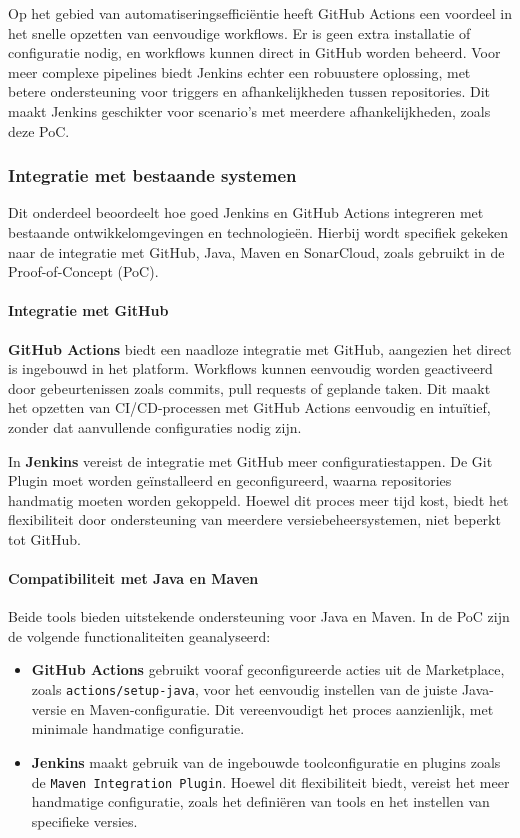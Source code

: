 Op het gebied van automatiseringsefficiëntie heeft GitHub Actions een voordeel in het snelle opzetten van eenvoudige workflows. Er is geen extra installatie of configuratie nodig, en workflows kunnen direct in GitHub worden beheerd. Voor meer complexe pipelines biedt Jenkins echter een robuustere oplossing, met betere ondersteuning voor triggers en afhankelijkheden tussen repositories. Dit maakt Jenkins geschikter voor scenario's met meerdere afhankelijkheden, zoals deze PoC.

\subsubsection{Integratie met bestaande systemen}
Dit onderdeel beoordeelt hoe goed Jenkins en GitHub Actions integreren met bestaande ontwikkelomgevingen en technologieën. Hierbij wordt specifiek gekeken naar de integratie met GitHub, Java, Maven en SonarCloud, zoals gebruikt in de Proof-of-Concept (PoC).

\paragraph{Integratie met GitHub}
\textbf{GitHub Actions} biedt een naadloze integratie met GitHub, aangezien het direct is ingebouwd in het platform. Workflows kunnen eenvoudig worden geactiveerd door gebeurtenissen zoals commits, pull requests of geplande taken. Dit maakt het opzetten van CI/CD-processen met GitHub Actions eenvoudig en intuïtief, zonder dat aanvullende configuraties nodig zijn.

In \textbf{Jenkins} vereist de integratie met GitHub meer configuratiestappen. De Git Plugin moet worden geïnstalleerd en geconfigureerd, waarna repositories handmatig moeten worden gekoppeld. Hoewel dit proces meer tijd kost, biedt het flexibiliteit door ondersteuning van meerdere versiebeheersystemen, niet beperkt tot GitHub.

\paragraph{Compatibiliteit met Java en Maven}
Beide tools bieden uitstekende ondersteuning voor Java en Maven. 
In de PoC zijn de volgende functionaliteiten geanalyseerd:
\begin{itemize}
    \item \textbf{GitHub Actions} gebruikt vooraf geconfigureerde acties uit de Marketplace, zoals \texttt{actions/setup-java}, voor het eenvoudig instellen van de juiste Java-versie en Maven-configuratie. Dit vereenvoudigt het proces aanzienlijk, met minimale handmatige configuratie.
    \item \textbf{Jenkins} maakt gebruik van de ingebouwde toolconfiguratie en plugins zoals de \texttt{Maven Integration Plugin}. Hoewel dit flexibiliteit biedt, vereist het meer handmatige configuratie, zoals het definiëren van tools en het instellen van specifieke versies.
\end{itemize}

